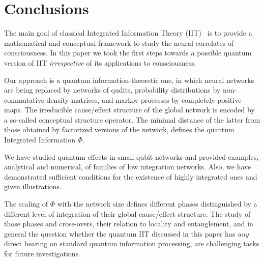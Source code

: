 \documentclass[aps,pra,groupaddress]{revtex4-1}
\begin{document}
\section{Conclusions}

The main goal of classical Integrated Information Theory (IIT)~\cite{IIT-0, IIT-1,IIT-2,IIT-3} is to provide a mathematical and conceptual framework to study the neural correlates of consciousness.
In this paper we took the first steps towards a possible quantum version of IIT {\em{irrespective}} of its applications to consciousness. 

Our approach is a quantum information-theoretic one, in which neural networks are being replaced by networks of qudits, probability distributions by non-commutative density matrices, and markov processes by completely positive maps. The irreducible cause/effect structure of the global network is encoded by a so-called conceptual structure operator. The minimal distance of the latter from those obtained by factorized versions of the network, defines the quantum Integrated Information $\Phi$. 

We have studied quantum effects in small qubit networks and provided examples, analytical and numerical, of families of low integration networks. Also, we have demonstrated sufficient conditions for the existence of highly integrated ones and given illustrations.

The scaling of $\Phi$ with the network size defines different phases distinguished by a different level of integration of their global cause/effect structure. 
The study of those phases and cross-overs, their relation to locality and entanglement, and in general the question whether the quantum IIT discussed in this paper has {\em{any}}
 direct bearing on standard quantum information processing, are challenging tasks for future investigations.
\end{document}
